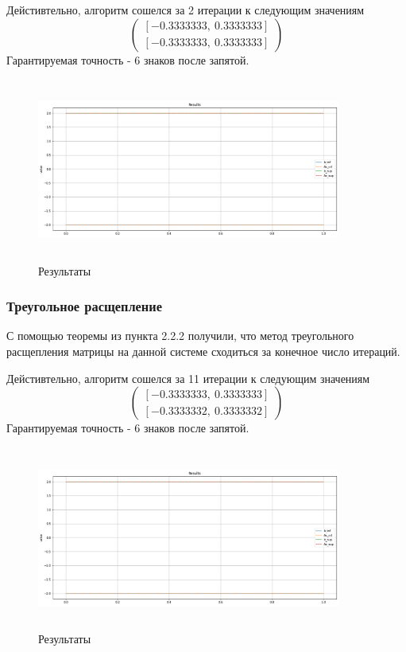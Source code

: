 \documentclass{article}
\begin{document}
    Дейстивтельно, алгоритм сошелся за 2 итерации к следующим значениям 
    \begin{equation*}
        \begin{pmatrix}
             [-0.3333333, \ 0.3333333] \\
             [-0.3333333, \ 0.3333333] 
        \end{pmatrix}
    \end{equation*}
    Гарантируемая точность - 6 знаков после запятой.
    \begin{figure}[H]
        \centering
        \includegraphics[width=10cm, height=6cm]{3.png}
        \caption{Результаты}
    \end{figure}
    
    
    \subsubsection{Треугольное расщепление}
    С помощью теоремы из пункта 2.2.2 получили, что метод треугольного расщепления матрицы на данной системе сходиться за конечное число итераций.
    
    Дейстивтельно, алгоритм сошелся за 11 итерации к следующим значениям 
    \begin{equation*}
        \begin{pmatrix}
             [-0.3333333, \ 0.3333333] \\
             [-0.3333332, \ 0.3333332] 
        \end{pmatrix}
    \end{equation*}
    Гарантируемая точность - 6 знаков после запятой.
     \begin{figure}[H]
        \centering
        \includegraphics[width=10cm, height=6cm]{4.png}
        \caption{Результаты}
    \end{figure}
    
\end{document}
